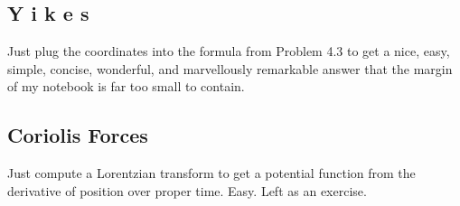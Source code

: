 \documentclass{article}
\begin{document}
 	\subsection{Y i k e s}
 	Just plug the coordinates into the formula from Problem 4.3 to get a nice, easy, simple, concise, wonderful, and marvellously remarkable answer that the margin of my notebook is far too small to contain.
 	\subsection{Coriolis Forces}
 	Just compute a Lorentzian transform to get a potential function from the derivative of position over proper time. Easy. Left as an exercise.
\end{document}
